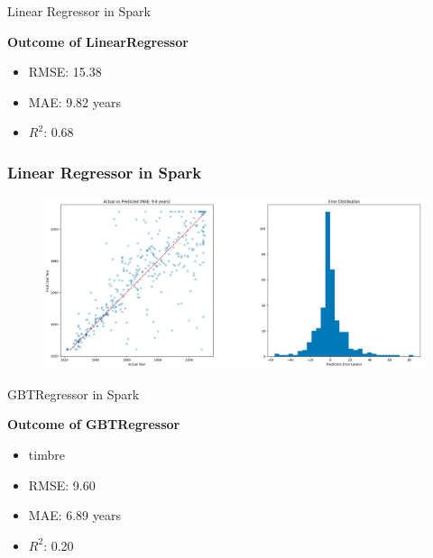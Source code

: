 \documentclass{beamer}
\begin{document}
\begin{frame}{Linear Regressor in Spark}

\textbf{Outcome of LinearRegressor}
\begin{itemize}
    \item RMSE: 15.38
    \item MAE: 9.82 years
    \item $R^2$: 0.68
\end{itemize}
\end{frame}

\begin{frame}[fragile]
    \frametitle{{Linear Regressor in Spark}}
\begin{figure}
    \centering
    \includegraphics[width=1\linewidth]{img/Linear.jpg}
\end{figure}
\end{frame}

\begin{frame}{GBTRegressor in Spark}

\textbf{Outcome of GBTRegressor}
\begin{itemize}
    \item timbre
    \item RMSE: 9.60
    \item MAE: 6.89 years
    \item $R^2$: 0.20
\end{itemize}
\end{frame}




\thankframe
\end{document}
